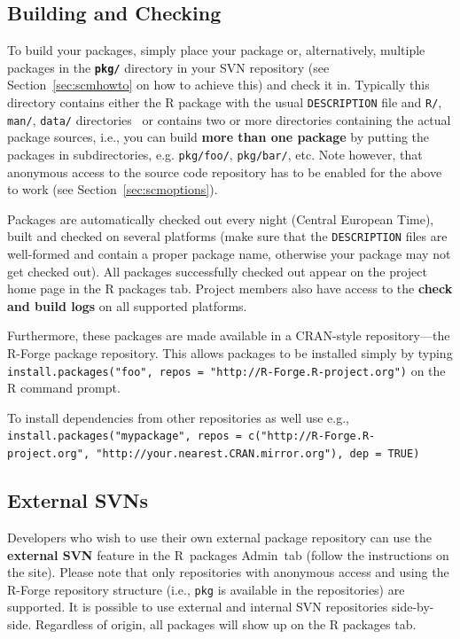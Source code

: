 \documentclass[a4paper]{article}
\let\code=\texttt
\newcommand{\proglang}[1]{\textsf{#1}}
\begin{document}
\subsection{Building and Checking}
To build your packages, simply place your package or, alternatively,
multiple packages in the \textbf{\texttt{pkg/}} directory in your SVN
repository (see Section~\ref{sec:scmhowto} on how to achieve this) and
check it in. Typically this directory contains either the \proglang{R}
package with the usual \texttt{DESCRIPTION} file and \texttt{R/},
\texttt{man/}, \texttt{data/} directories~\citep[see][for more
details]{Rcore:writing_R_extensions} or contains two or more
directories containing the actual package sources, i.e., you can build
\textbf{more than one package} by putting the packages in
subdirectories, e.g. \texttt{pkg/foo/}, \texttt{pkg/bar/}, etc. Note
however, that anonymous access to the source code repository has to
be enabled for the above to work (see Section~\ref{sec:scmoptions}).

Packages are automatically checked out every night (Central European
Time), built and checked on several platforms (make sure that the
\texttt{DESCRIPTION} files are well-formed and contain a proper 
package name, otherwise your package may not get checked out). All
packages successfully checked out appear on the project home page in
the \proglang{R} packages tab. Project members also have access to the
\textbf{check and build logs} on all supported platforms.  

Furthermore, these packages are made available in a CRAN-style
repository---the
\proglang{R}-Forge package repository. This allows packages to be installed simply by
typing \texttt{install.packages("foo", repos = "http://R-Forge.R-project.org")}
on the \proglang{R} command prompt. 

To install dependencies from other repositories as well use e.g.,
\code{install.packages("mypackage", repos = c("http://R-Forge.R-project.org",
"http://your.nearest.CRAN.mirror.org"), dep = TRUE)}

\subsection{External SVNs}
Developers who wish to use their own external package repository can
use the \textbf{external SVN} feature in the \proglang{R}~packages
Admin~tab (follow the instructions on the site). Please note that only
repositories with anonymous access and using the \proglang{R}-Forge
repository structure (i.e., \texttt{pkg} is available in the
repositories) are supported. It is possible to use external and
internal SVN repositories side-by-side. Regardless of origin, all
packages will show up on the \proglang{R} packages tab.
\end{document}
